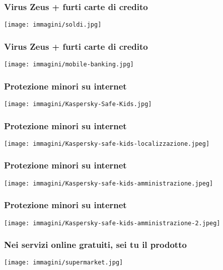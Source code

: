 \documentclass[italian,aspectratio=169]{beamer}
\begin{document}
\begin{frame}
 \frametitle{Virus Zeus + furti carte di credito}
   \begin{center}
   \texttt{[image: immagini/soldi.jpg]}
 \end{center}
\end{frame}

\begin{frame}
 \frametitle{Virus Zeus + furti carte di credito}
   \begin{center}
    \texttt{[image: immagini/mobile-banking.jpg]}
   \end{center}
\end{frame}


\begin{frame}
 \frametitle{Protezione minori su internet}
  \begin{center}
   \texttt{[image: immagini/Kaspersky-Safe-Kids.jpg]}
 \end{center}
\end{frame}

\begin{frame}
 \frametitle{Protezione minori su internet}
  \begin{center}
   \texttt{[image: immagini/Kaspersky-safe-kids-localizzazione.jpeg]}
 \end{center}
\end{frame}

\begin{frame}
 \frametitle{Protezione minori su internet}
  \begin{center}
   \texttt{[image: immagini/Kaspersky-safe-kids-amministrazione.jpeg]}
 \end{center}
\end{frame}

\begin{frame}
 \frametitle{Protezione minori su internet}
  \begin{center}
   \texttt{[image: immagini/Kaspersky-safe-kids-amministrazione-2.jpeg]}
 \end{center}
\end{frame}

\begin{frame}
 \frametitle{Nei servizi online gratuiti, sei tu il prodotto}
 \vspace{-0.4cm}
   \begin{center}
   \texttt{[image: immagini/supermarket.jpg]}
 \end{center}
\end{frame}
\end{document}
